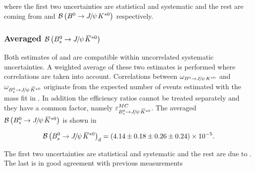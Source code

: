  \noindent where the first two uncertainties are statistical and systematic and the rest are coming from \fdfs and $\BRof\BdJpsiKst$ respectively.

\subsubsection{Averaged $\BRof\BsJpsiKst$}
Both estimates of  and  are compatible within uncorrelated systematic uncertainties. A weighted average of these two
estimates is performed where correlations are taken into account. Correlations between $\omega_{\BdJpsiKst}$ and $\omega_{\BsJpsiKst}$ originate from the
expected number of events estimated with the mass fit in . In addition the efficiency ratios cannot be treated separately
and they have a common factor, namely $\varepsilon_{\BsJpsiKst}^{MC}$. The averaged  $\BRof\BsJpsiKst$ is shown in 

\begin{equation}
  \centering
\BRof\BsJpsiKst_{d} = (4.14 \pm 0.18 \pm 0.26 \pm 0.24 )\times 10^{-5}.
\label{Br_total}
\end{equation}

\noindent The first two uncertainties are statistical and systematic and the rest are due to \fdfs.
The last is in good agreement with previous measurements~\cite{Aaij:2012nh}
